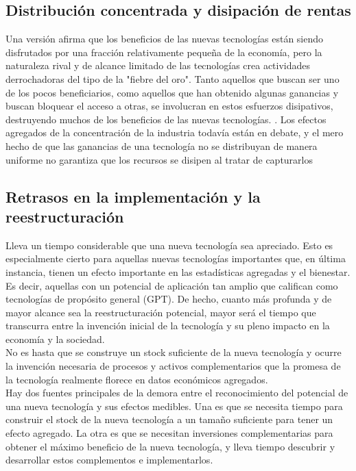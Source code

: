     \subsection{Distribución concentrada y disipación de rentas}
    Una versión afirma que los beneficios de las nuevas tecnologías están siendo disfrutados por una fracción relativamente pequeña de la economía, pero la naturaleza rival y de alcance limitado de las tecnologías crea actividades derrochadoras del tipo de la "fiebre del oro". Tanto aquellos que buscan ser uno de los pocos beneficiarios, como aquellos que han obtenido algunas ganancias y buscan bloquear el acceso a otras, se involucran en estos esfuerzos disipativos, destruyendo muchos de los beneficios de las nuevas tecnologías. . Los efectos agregados de la concentración de la industria todavía están en debate, y el mero hecho de que las ganancias de una tecnología no se distribuyan de manera uniforme no garantiza que los recursos se disipen al tratar de capturarlos

    \subsection{Retrasos en la implementación y la reestructuración}
    Lleva un tiempo considerable que una nueva tecnología sea apreciado. Esto es especialmente cierto para aquellas nuevas tecnologías importantes que, en última instancia, tienen un efecto importante en las estadísticas agregadas y el bienestar. Es decir, aquellas con un potencial de aplicación tan amplio que califican como tecnologías de propósito general (GPT). De hecho, cuanto más profunda y de mayor alcance sea la reestructuración potencial, mayor será el tiempo que transcurra entre la invención inicial de la tecnología y su pleno impacto en la economía y la sociedad.\\
    No es hasta que se construye un stock suficiente de la nueva tecnología y ocurre la invención necesaria de procesos y activos complementarios que la promesa de la tecnología realmente florece en datos económicos agregados.\\
    Hay dos fuentes principales de la demora entre el reconocimiento del potencial de una nueva tecnología y sus efectos medibles. Una es que se necesita tiempo para construir el stock de la nueva tecnología a un tamaño suficiente para tener un efecto agregado. La otra es que se necesitan inversiones complementarias para obtener el máximo beneficio de la nueva tecnología, y lleva tiempo descubrir y desarrollar estos complementos e implementarlos.

